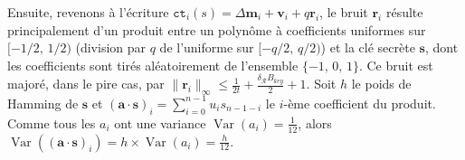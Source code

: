 \documentclass[11pt, headsepline, a4paper, fleqn, oneside]{article}
\begin{document}
Ensuite, revenons à l'écriture $\texttt{ct}_i (s) = \Delta\boldsymbol{m}_i + \boldsymbol{v}_i + q\boldsymbol{r}_i$, le bruit $\boldsymbol{r}_i$ résulte principalement d'un produit entre un polynôme à coefficients uniformes sur $[-1/2,\,1/2)$ (division par $q$ de l'uniforme sur $[-q/2,\,q/2)$) et la clé secrète $\boldsymbol{s}$, dont les coefficients sont tirés aléatoirement de l'ensemble $\{-1,\,0,\,1\}$. Ce bruit est majoré, dans le pire cas, par  $\|\boldsymbol{r}_i\|_\infty \leq \frac{1}{2t}+ \frac{\delta_\mathcal{R} B_{key}}{2} + 1$. Soit $h$ le poids de Hamming de $\boldsymbol{s}$ et $(\boldsymbol{a}\cdot\boldsymbol{s})_i = \sum_{i=0}^{n-1} u_{i} s_{n-1-i}$ le $i$-ème coefficient du produit. Comme tous les $a_i$ ont une variance $\operatorname{Var}(a_i) =\frac{1}{12}$, alors $\operatorname{Var}((\boldsymbol{a}\cdot\boldsymbol{s})_i) = h \times \operatorname{Var}(a_i) = \frac{h}{12}$.\\
\end{document}
